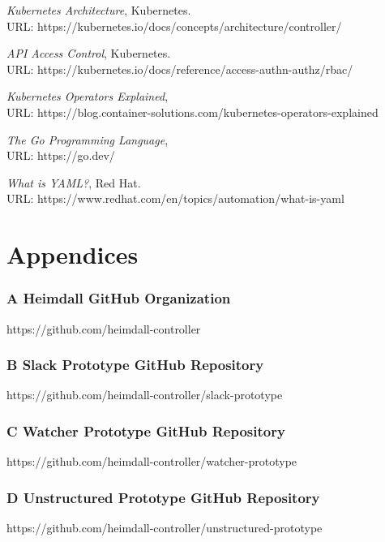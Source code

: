 \documentclass{article}
\begin{document}
\begin{thebibliography}{9}
\emph{Kubernetes Architecture}, Kubernetes. \\URL: https://kubernetes.io/docs/concepts/architecture/controller/ 
  
\emph{API Access Control}, Kubernetes. \\ URL: https://kubernetes.io/docs/reference/access-authn-authz/rbac/  

\emph{Kubernetes Operators Explained}, \\URL: https://blog.container-solutions.com/kubernetes-operators-explained
  
\emph{The Go Programming Language}, \\URL: https://go.dev/

\emph{What is YAML?}, Red Hat. \\URL: https://www.redhat.com/en/topics/automation/what-is-yaml
  

\end{thebibliography}

\clearpage
\section*{Appendices}
\subsubsection*{A Heimdall GitHub Organization} 
\hypertarget{appendix-a}{https://github.com/heimdall-controller}

\subsubsection*{B Slack Prototype GitHub Repository} 
\hypertarget{appendix-b}{https://github.com/heimdall-controller/slack-prototype}

\subsubsection*{C Watcher Prototype GitHub Repository} 
\hypertarget{appendix-c}{https://github.com/heimdall-controller/watcher-prototype}

\subsubsection*{D Unstructured Prototype GitHub Repository} 
\hypertarget{appendix-d}{https://github.com/heimdall-controller/unstructured-prototype}
\end{document}
